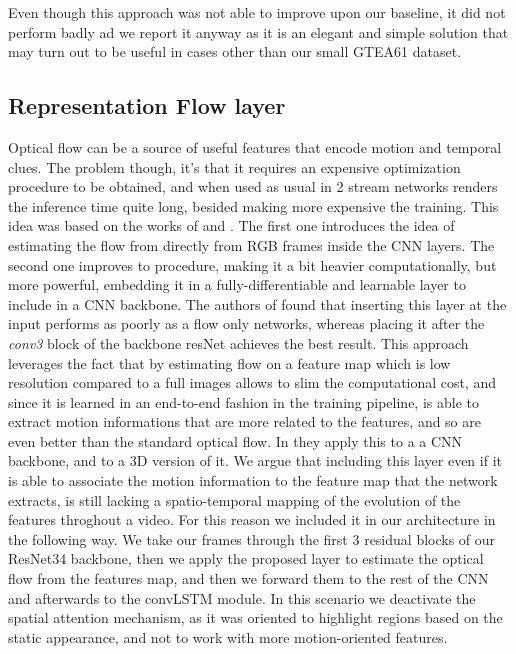 \documentclass[10pt,twocolumn,hidelinks,letterpaper]{article}
\begin{document}
Even though this approach was not able to improve upon our baseline, it did not perform
badly ad we report it anyway as it is an elegant and simple solution that may turn out to be useful in cases other than our small GTEA61 dataset.

\subsection{Representation Flow layer}
Optical flow can be a source of useful features that encode motion and temporal clues.
The problem though, it's that it requires an expensive optimization procedure to be obtained, and when used as usual in 2 stream networks renders the inference time quite long, besided making more expensive the training.
This idea was based on the works of \cite{motfilt} and \cite{reprflow}. The first one
introduces the idea of estimating the flow from directly from RGB frames inside the CNN layers. The second one improves to procedure, making it a bit heavier computationally, but more powerful, embedding it in a fully-differentiable and learnable layer to include in a CNN backbone. The authors of \cite{reprflow} found that inserting this layer at the input performs as poorly as a flow only networks, whereas placing it after the \textit{conv3} block of the backbone resNet achieves the best result. This approach leverages the
fact that by estimating flow on a feature map which is low resolution compared to a full images allows to slim the computational cost, and since it is learned in an end-to-end fashion in the training pipeline, is able to extract motion informations that are more related to the features, and so are even better than the standard optical flow.
In \cite{reprflow} they apply this to a a CNN backbone, and to a 3D version of it. We argue that including this layer even if it is able to associate the motion information to the feature map that the network extracts, is still lacking a spatio-temporal mapping of the evolution of the features throghout a video. For this reason we included it in
our architecture in the following way.
We take our frames through the first 3 residual blocks of our ResNet34 backbone, then
we apply the proposed layer to estimate the optical flow from the features map, and then
we forward them to the rest of the CNN and afterwards to the convLSTM module. In
this scenario we deactivate the spatial attention mechanism, as it was oriented to
highlight regions based on the static appearance, and not to work with more motion-oriented features.
\end{document}
